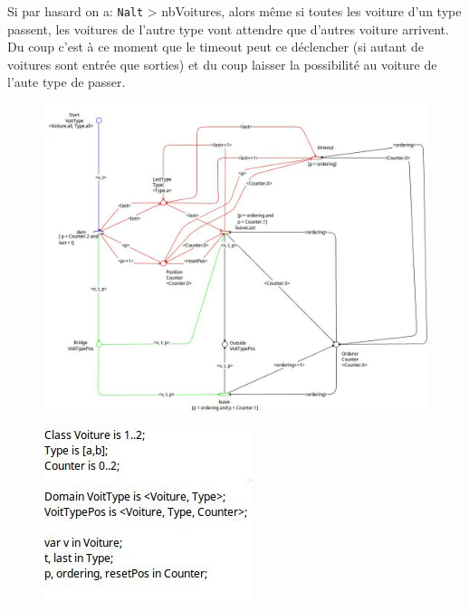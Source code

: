 Si par hasard on a: \texttt{Nalt} > nbVoitures, alors même si toutes les voiture d'un type passent, les voitures de l'autre type vont attendre que d'autres voiture arrivent. Du coup c'est à ce moment que le timeout peut ce déclencher (si autant de voitures sont entrée que sorties) et du coup laisser la possibilité au voiture de l'aute type de passer.

\begin{figure}[ht]
    \centering
    \includegraphics[scale=0.4]{figures/full-model.jpeg}
    \label{fig:model}
\end{figure}

\begin{figure}[ht]
  \centering
  \includegraphics[scale=0.4]{figures/full-model-def.jpeg}
\end{figure}

